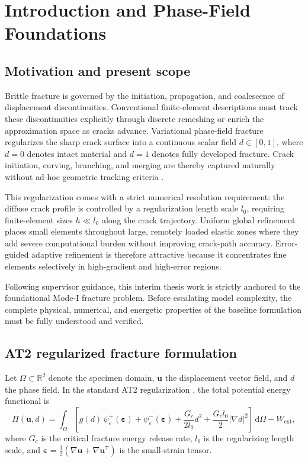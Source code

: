\chapter{Introduction and Phase-Field Foundations}
\label{ch:foundations}

\section{Motivation and present scope}

Brittle fracture is governed by the initiation, propagation, and coalescence of displacement discontinuities. Conventional finite-element descriptions must track these discontinuities explicitly through discrete remeshing or enrich the approximation space as cracks advance. Variational phase-field fracture regularizes the sharp crack surface into a continuous scalar field $d\in[0,1]$, where $d=0$ denotes intact material and $d=1$ denotes fully developed fracture. Crack initiation, curving, branching, and merging are thereby captured naturally without ad-hoc geometric tracking criteria \citep{francfort1998,bourdin2000,bourdin2008,miehe2010a}.

This regularization comes with a strict numerical resolution requirement: the diffuse crack profile is controlled by a regularization length scale $l_0$, requiring finite-element sizes $h \ll l_0$ along the crack trajectory. Uniform global refinement places small elements throughout large, remotely loaded elastic zones where they add severe computational burden without improving crack-path accuracy. Error-guided adaptive refinement is therefore attractive because it concentrates fine elements selectively in high-gradient and high-error regions.

Following supervisor guidance, this interim thesis work is strictly anchored to the foundational Mode-I fracture problem. Before escalating model complexity, the complete physical, numerical, and energetic properties of the baseline formulation must be fully understood and verified.

\section{AT2 regularized fracture formulation}

Let $\Omega\subset\mathbb{R}^2$ denote the specimen domain, $\mathbf{u}$ the displacement vector field, and $d$ the phase field. In the standard AT2 regularization \citep{bourdin2000,bourdin2008}, the total potential energy functional is
\begin{equation}
\Pi(\mathbf{u},d)=
\int_{\Omega}\left[g(d)\,\psi_e^{+}(\boldsymbol{\varepsilon})
+\psi_e^{-}(\boldsymbol{\varepsilon})
+\frac{G_c}{2l_0}d^2
+\frac{G_c l_0}{2}\lvert\nabla d\rvert^2\right]\,\mathrm{d}\Omega
-W_{\mathrm{ext}},
\label{eq:total_potential}
\end{equation}
where $G_c$ is the critical fracture energy release rate, $l_0$ is the regularizing length scale, and $\boldsymbol{\varepsilon}=\frac{1}{2}(\nabla\mathbf{u}+\nabla\mathbf{u}^{\mathsf T})$ is the small-strain tensor.

